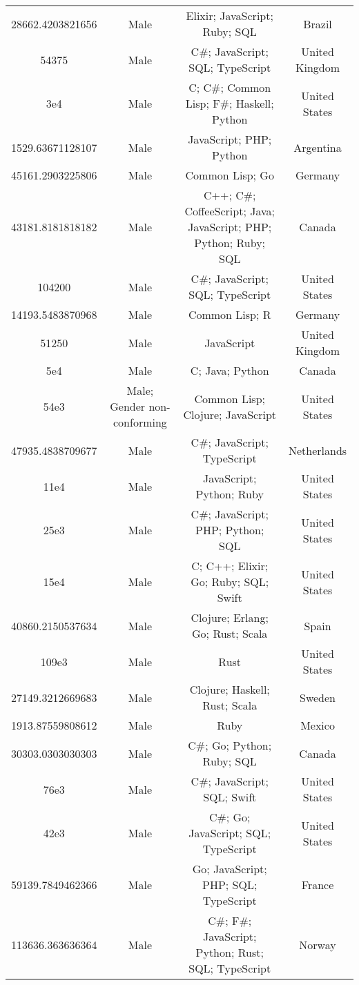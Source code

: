 \begin{center}
\begin{tabular}{ |c|c|c|c| }
28662.4203821656  &  Male  &  Elixir; JavaScript; Ruby; SQL  &  Brazil  \\ 
54375  &  Male  &  C\#; JavaScript; SQL; TypeScript  &  United Kingdom  \\ 
3e4  &  Male  &  C; C\#; Common Lisp; F\#; Haskell; Python  &  United States  \\ 
1529.63671128107  &  Male  &  JavaScript; PHP; Python  &  Argentina  \\ 
45161.2903225806  &  Male  &  Common Lisp; Go  &  Germany  \\ 
43181.8181818182  &  Male  &  C++; C\#; CoffeeScript; Java; JavaScript; PHP; Python; Ruby; SQL  &  Canada  \\ 
104200  &  Male  &  C\#; JavaScript; SQL; TypeScript  &  United States  \\ 
14193.5483870968  &  Male  &  Common Lisp; R  &  Germany  \\ 
51250  &  Male  &  JavaScript  &  United Kingdom  \\ 
5e4  &  Male  &  C; Java; Python  &  Canada  \\ 
54e3  &  Male; Gender non-conforming  &  Common Lisp; Clojure; JavaScript  &  United States  \\ 
47935.4838709677  &  Male  &  C\#; JavaScript; TypeScript  &  Netherlands  \\ 
11e4  &  Male  &  JavaScript; Python; Ruby  &  United States  \\ 
25e3  &  Male  &  C\#; JavaScript; PHP; Python; SQL  &  United States  \\ 
15e4  &  Male  &  C; C++; Elixir; Go; Ruby; SQL; Swift  &  United States  \\ 
40860.2150537634  &  Male  &  Clojure; Erlang; Go; Rust; Scala  &  Spain  \\ 
109e3  &  Male  &  Rust  &  United States  \\ 
27149.3212669683  &  Male  &  Clojure; Haskell; Rust; Scala  &  Sweden  \\ 
1913.87559808612  &  Male  &  Ruby  &  Mexico  \\ 
30303.0303030303  &  Male  &  C\#; Go; Python; Ruby; SQL  &  Canada  \\ 
76e3  &  Male  &  C\#; JavaScript; SQL; Swift  &  United States  \\ 
42e3  &  Male  &  C\#; Go; JavaScript; SQL; TypeScript  &  United States  \\ 
59139.7849462366  &  Male  &  Go; JavaScript; PHP; SQL; TypeScript  &  France  \\ 
113636.363636364  &  Male  &  C\#; F\#; JavaScript; Python; Rust; SQL; TypeScript  &  Norway  \\ 

\end{tabular}
\end{center}
